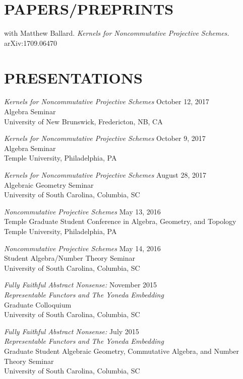 \documentclass[line,overlapped]{res}
\begin{document}
\begin{resume}
         \newpage
 \section{PAPERS/PREPRINTS}
         with Matthew Ballard.  {\sl Kernels for Noncommutative Projective Schemes.} 
	  arXiv:1709.06470

          \section{PRESENTATIONS}
         {\sl Kernels for Noncommutative Projective Schemes} \hfill October 12, 2017\\
         Algebra Seminar\\
         University of New Brunswick, Fredericton, NB, CA
         
         {\sl Kernels for Noncommutative Projective Schemes} \hfill October 9, 2017\\
         Algebra Seminar\\
         Temple University, Philadelphia, PA
         
         {\sl Kernels for Noncommutative Projective Schemes} \hfill August 28, 2017\\
         Algebraic Geometry Seminar\\
         University of South Carolina, Columbia, SC
         
         {\sl Noncommutative Projective Schemes} \hfill May 13, 2016\\
         Temple Graduate Student Conference in Algebra, Geometry, and Topology\\
         Temple University, Philadelphia, PA

         {\sl Noncommutative Projective Schemes} \hfill May 14, 2016\\
         Student Algebra/Number Theory Seminar\\
         University of South Carolina, Columbia, SC

         {\sl Fully Faithful Abstract Nonsense:} \hfill November 2015\\
         {\sl Representable Functors and The Yoneda Embedding}\\
         Graduate Colloquium\\
         University of South Carolina, Columbia, SC

         {\sl Fully Faithful Abstract Nonsense:} \hfill July 2015\\
         {\sl Representable Functors and The Yoneda Embedding}\\
         Graduate Student Algebraic Geometry, Commutative Algebra, and Number Theory Seminar\\
         University of South Carolina, Columbia, SC


\end{resume}
\end{document}
